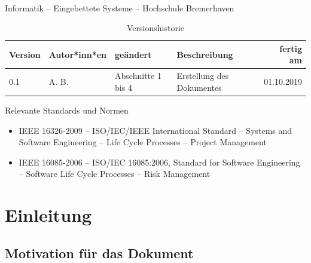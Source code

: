\begin{center}
  \makeatletter
  \textbf{
    \@title
  }
  \makeatother
  \\[1em]
  Informatik -- Eingebettete Systeme -- Hochschule Bremerhaven
\end{center}

\begin{table}[ht]
  \centering
  \begin{tabular}[t]{|p{15mm}|p{30mm}|p{30mm}|p{50mm}|r|}
    \hline
    \textbf{Version} & \textbf{Autor*inn*en} & \textbf{geändert} & \textbf{Beschreibung} & \textbf{fertig am}\\
    \hline
    0.1              & A. B.            &  Abschnitte 1 bis 4  & Erstellung des Dokumentes & 01.10.2019\\
    \hline
  \end{tabular}
  \caption{Versionshistorie}
\end{table}

\vspace*{4em}

Relevante Standards und Normen
\begin{itemize}
\item IEEE 16326-2009 -- ISO/IEC/IEEE International Standard --
  Systems and Software Engineering -- Life Cycle Processes -- Project
  Management

  \cite{ieee-16326-2009-project-management}
\item IEEE 16085-2006 -- ISO/IEC 16085:2006, Standard for Software
  Engineering -- Software Life Cycle Processes -- Risk Management

  \cite{ieee-16085-2006-risk-management}
\end{itemize}
\clearpage

\chapter{Einleitung}
\label{spmp:einleitung}

\section{Motivation für das Dokument}

